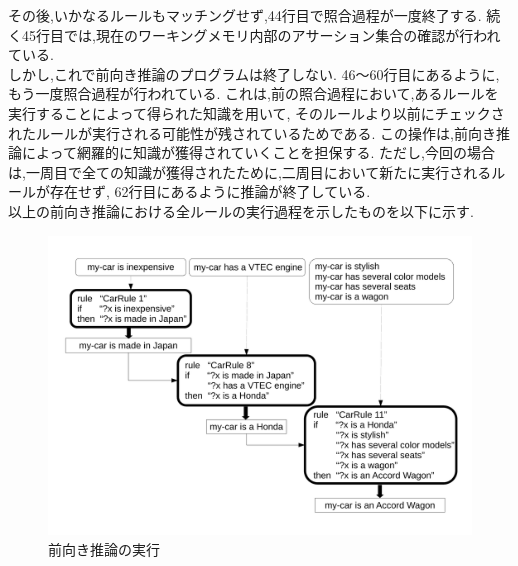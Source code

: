 \documentclass[uplatex,12pt]{jsarticle}
\begin{document}
その後,いかなるルールもマッチングせず,44行目で照合過程が一度終了する.
続く45行目では,現在のワーキングメモリ内部のアサーション集合の確認が行われている. \\
しかし,これで前向き推論のプログラムは終了しない.
46〜60行目にあるように,もう一度照合過程が行われている.
これは,前の照合過程において,あるルールを実行することによって得られた知識を用いて,
そのルールより以前にチェックされたルールが実行される可能性が残されているためである.
この操作は,前向き推論によって網羅的に知識が獲得されていくことを担保する.
ただし,今回の場合は,一周目で全ての知識が獲得されたために,二周目において新たに実行されるルールが存在せず,
62行目にあるように推論が終了している. \\
以上の前向き推論における全ルールの実行過程を示したものを以下に示す.
\begin{figure}[!hbt]
    \centering
    \includegraphics[scale=0.40]{images/forward_chaining_4.pdf}
    \caption{前向き推論の実行}
\end{figure}

\newpage
\end{document}
